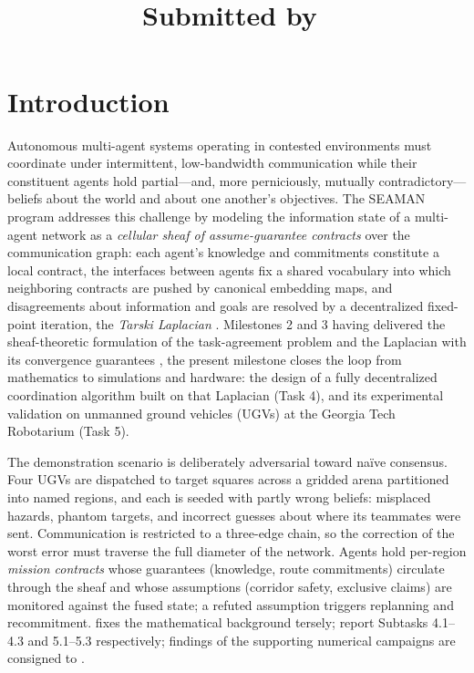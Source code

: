 \documentclass[10pt]{article}
\title{{\huge\sffamily\bfseries \ProjectName} \\ \vspace{10pt} {\Large\it \ReportName} \\ \vspace{10pt} {\normalsize Submitted by~\Author}}
\date{}
\theoremstyle{definition}
\theoremstyle{remark}
\begin{document}
\maketitle
\tableofcontents
\vspace{1cm}
\thispagestyle{fancy}

\section{Introduction}
\label{sec:intro}

Autonomous multi-agent systems operating in contested environments must coordinate under intermittent, low-bandwidth communication while their constituent agents hold partial---and, more perniciously, mutually contradictory---beliefs about the world and about one another's objectives. The SEAMAN program addresses this challenge by modeling the information state of a multi-agent network as a \emph{cellular sheaf of assume-guarantee contracts} over the communication graph: each agent's knowledge and commitments constitute a local contract, the interfaces between agents fix a shared vocabulary into which neighboring contracts are pushed by canonical embedding maps, and disagreements about information and goals are resolved by a decentralized fixed-point iteration, the \emph{Tarski Laplacian} \citep{Ghrist_2022,riessDiffusionInformationNetworked2022,ghristCategoricalDiffusionWeighted2026}.
Milestones 2 and 3 having delivered the sheaf-theoretic formulation of the task-agreement problem and the Laplacian with its convergence guarantees \citep{riessSEAMANMS2,riessSEAMANMS3}, the present milestone closes the loop from mathematics to simulations and hardware: the design of a fully decentralized coordination algorithm built on that Laplacian (Task 4), and its experimental validation on unmanned ground vehicles (UGVs) at the Georgia Tech Robotarium \citep{pickemRobotarium2017} (Task 5).

The demonstration scenario is deliberately adversarial toward na\"ive consensus. Four UGVs are dispatched to target squares across a gridded arena partitioned into named regions, and each is seeded with partly wrong beliefs: misplaced hazards, phantom targets, and incorrect guesses about where its teammates were sent. Communication is restricted to a three-edge chain, so the correction of the worst error must traverse the full diameter of the network.
Agents hold per-region \emph{mission contracts} whose guarantees (knowledge, route commitments) circulate through the sheaf and whose assumptions (corridor safety, exclusive claims) are monitored against the fused state; a refuted assumption triggers replanning and recommitment.
 fixes the mathematical background tersely;  report Subtasks 4.1--4.3 and 5.1--5.3 respectively; findings of the supporting numerical campaigns are consigned to .
\end{document}
